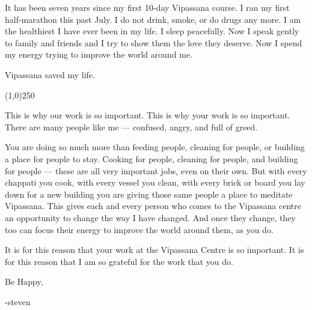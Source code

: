 \documentclass{article}
\begin{document}
It has been seven years since my first 10-day Vipassana course. I ran my first
half-marathon this past July. I do not drink, smoke, or do drugs any more. I am the
healthiest I have ever been in my life. I sleep peacefully. Now I speak gently to
family and friends and I try to show them the love they deserve. Now I spend my energy
trying to improve the world around me.

Vipassana saved my life.

\begin{center}
\line(1,0){250}
\end{center}

This is why our work is so important. This is why your work is so important. There
are many people like me --- confused, angry, and full of greed.

You are doing so much more than feeding people, cleaning for people,
or building a place for people to stay. Cooking for people, cleaning for people, and
building for people --- these are all very important jobs, even on their own. But
with every chappati you cook, with every vessel you clean, with every brick or board
you lay down for a new building you are giving those same people a place to meditate
Vipassana. This gives each and every person who comes to the Vipassana centre an
opportunity to change the way I have changed. And once they change, they too can
focus their energy to improve the world around them, as you do.

It is for this reason that your work at the Vipassana Centre is so important. It is
for this reason that I am so grateful for the work that you do.

Be Happy,

-steven
\end{document}
